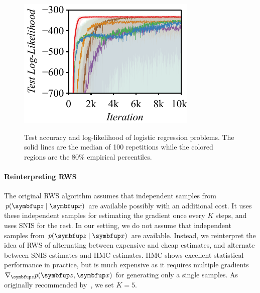 \begin{figure}
{    \includegraphics[scale=0.80]{figures/pima_03.pdf}
  }
  \caption{Test accuracy and log-likelihood of logistic regression problems.
    The solid lines are the median of 100 repetitions while the colored regions are the 80\% empirical percentiles.
  }\label{fig:logistic}
\end{figure}

\paragraph{Reinterpreting RWS}
The original RWS algorithm assumes that independent samples from \(p(\vz\mid\vx)\) are available possibly with an additional cost.
It uses these independent samples for estimating the gradient once every \(K\) steps, and uses SNIS for the rest.
In our setting, we do not assume that independent samples from \(p(\vz\mid\vx)\) are available.
Instead, we reinterpret the idea of RWS of alternating between expensive and cheap estimates, and alternate between SNIS estimates and HMC estimates.
HMC shows excellent statistical performance in practice, but is much expensive as it requires multiple gradients \(\nabla_{\vz} p(\vz, \vx)\) for generating only a single samples.
As originally recommended by~\citet{DBLP:journals/corr/BornscheinB14}, we set \(K=5\).

